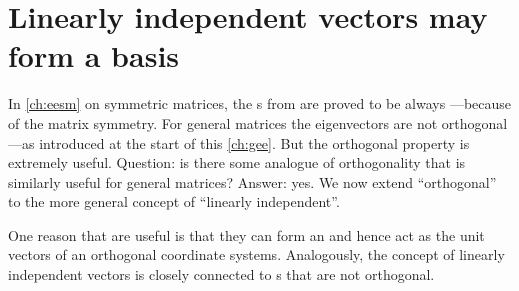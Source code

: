 
\section{Linearly independent vectors may form a basis}
\label{sec:lisb}

\secttoc
\begin{comment}
\pooliv{p.92--7,198--208} \holti{\S2.3}
\end{comment}



In \cref{ch:eesm} on symmetric matrices, the s from  are proved to be always ---because of the matrix symmetry.  
For general matrices the eigenvectors are not orthogonal---as introduced at the start of this \cref{ch:gee}.  
But the orthogonal property is extremely useful.
Question: is there some analogue of orthogonality that is similarly useful for general matrices?
Answer: yes. 
We now extend ``orthogonal'' to the more general concept of ``linearly independent''.

One reason that  are useful is that they can form an  and hence act as the unit vectors of an orthogonal coordinate systems.
Analogously, the concept of linearly independent vectors is closely connected to s that are not orthogonal.



